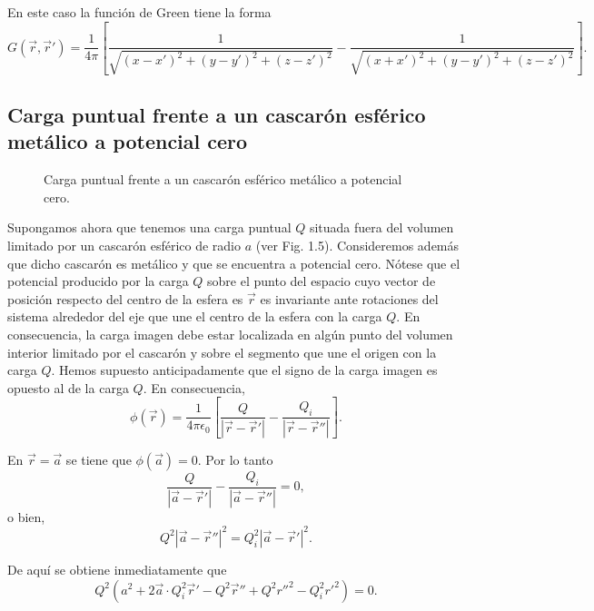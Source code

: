 \documentclass[12pt,a4paper]{book}
\begin{document}
En este caso la función de Green tiene la forma
\begin{equation}
G(\vec{r},\vec{r}') = \frac{1}{4\pi}\left[\frac{1}{\sqrt{(x - x')^2 + (y - y')^2 + (z - z')^2}} - \frac{1}{\sqrt{(x + x')^2 + (y - y')^2 + (z - z')^2}}\right].
\end{equation}

\subsection{Carga puntual frente a un cascarón esférico metálico a potencial cero}

\begin{figure}
\centering
\caption{Carga puntual frente a un cascarón esférico metálico a potencial cero.}
\label{fig:1.5}
\end{figure}

Supongamos ahora que tenemos una carga puntual $Q$ situada fuera del volumen limitado por un cascarón esférico de radio $a$ (ver Fig. 1.5). Consideremos además que dicho cascarón es metálico y que se encuentra a potencial cero. Nótese que el potencial producido por la carga $Q$ sobre el punto del espacio cuyo vector de posición respecto del centro de la esfera es $\vec{r}$ es invariante ante rotaciones del sistema alrededor del eje que une el centro de la esfera con la carga $Q$. En consecuencia, la carga imagen debe estar localizada en algún punto del volumen interior limitado por el cascarón y sobre el segmento que une el origen con la carga $Q$. Hemos supuesto anticipadamente que el signo de la carga imagen es opuesto al de la carga $Q$. En consecuencia,
\begin{equation}
\phi(\vec{r}) = \frac{1}{4\pi\epsilon_0}\left[\frac{Q}{|\vec{r} - \vec{r}'|} - \frac{Q_i}{|\vec{r} - \vec{r}''|}\right].
\end{equation}

En $\vec{r} = \vec{a}$ se tiene que $\phi(\vec{a}) = 0$. Por lo tanto
\begin{equation}
\frac{Q}{|\vec{a} - \vec{r}'|} - \frac{Q_i}{|\vec{a} - \vec{r}''|} = 0,
\end{equation}
o bien,
\begin{equation}
Q^2|\vec{a} - \vec{r}''|^2 = Q_i^2|\vec{a} - \vec{r}'|^2.
\end{equation}

De aquí se obtiene inmediatamente que
\begin{equation}
Q^2(a^2 + 2\vec{a} \cdot Q_i^2 \vec{r}' - Q^2 \vec{r}'' + Q^2 r''^2 - Q_i^2 r'^2) = 0.
\end{equation}
\end{document}
